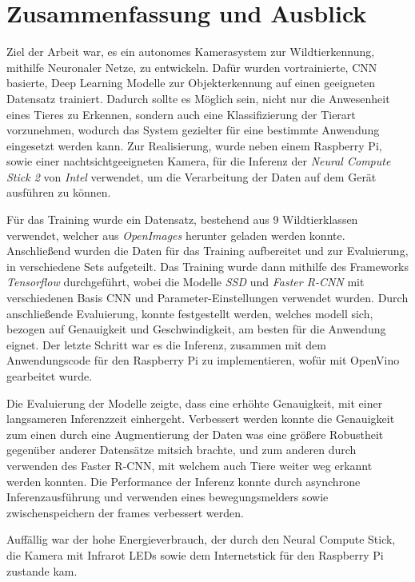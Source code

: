 \chapter{Zusammenfassung und Ausblick}\label{kap:zusammenfassungausblick}


Ziel der Arbeit war, es ein autonomes
Kamerasystem zur Wildtierkennung,
mithilfe Neuronaler Netze, zu entwickeln.
Dafür wurden vortrainierte, CNN basierte, 
Deep Learning Modelle zur Objekterkennung
auf einen geeigneten Datensatz trainiert.
Dadurch sollte es Möglich sein, nicht 
nur die Anwesenheit eines Tieres 
zu Erkennen, sondern auch eine 
Klassifizierung der Tierart 
vorzunehmen, wodurch das System
gezielter für eine bestimmte
Anwendung eingesetzt werden kann.
Zur Realisierung, wurde neben einem Raspberry
Pi, sowie einer nachtsichtgeeigneten 
Kamera, für die Inferenz der 
\textit{Neural Compute Stick 2}
von \textit{Intel} verwendet, um die 
Verarbeitung der Daten auf dem 
Gerät ausführen zu können.
\vspace{0.5cm}

Für das Training wurde ein Datensatz, 
bestehend aus 9 Wildtierklassen verwendet,
welcher aus \textit{OpenImages} herunter 
geladen werden konnte.
Anschließend wurden die Daten 
für das Training aufbereitet und
zur Evaluierung, in verschiedene 
Sets aufgeteilt.
Das Training wurde dann mithilfe des 
Frameworks \textit{Tensorflow} durchgeführt,
wobei die Modelle \textit{SSD} und
\textit{Faster R-CNN} mit verschiedenen
Basis CNN und Parameter-Einstellungen
verwendet wurden.
Durch anschließende Evaluierung, konnte 
festgestellt werden, welches modell sich,
bezogen auf Genauigkeit und Geschwindigkeit,
am besten für die Anwendung eignet.
Der letzte Schritt war es die Inferenz, zusammen 
mit dem Anwendungscode für den Raspberry Pi 
zu implementieren, wofür mit OpenVino gearbeitet 
wurde.
\vspace{0.5cm}

Die Evaluierung der Modelle zeigte, dass 
eine erhöhte Genauigkeit, mit einer 
langsameren Inferenzzeit einhergeht.
Verbessert werden konnte die Genauigkeit 
zum einen durch eine Augmentierung der Daten 
was eine größere Robustheit gegenüber anderer 
Datensätze mitsich brachte, und zum 
anderen durch verwenden des Faster 
R-CNN, mit welchem auch Tiere weiter 
weg erkannt werden konnten.
Die Performance der Inferenz konnte durch 
asynchrone Inferenzausführung und 
verwenden eines bewegungsmelders sowie 
zwischenspeichern der frames verbessert werden.
\vspace{0.5cm}


Auffällig war der hohe Energieverbrauch, 
der durch den Neural Compute Stick, die Kamera mit 
Infrarot LEDs sowie dem Internetstick für den 
Raspberry Pi zustande kam.

